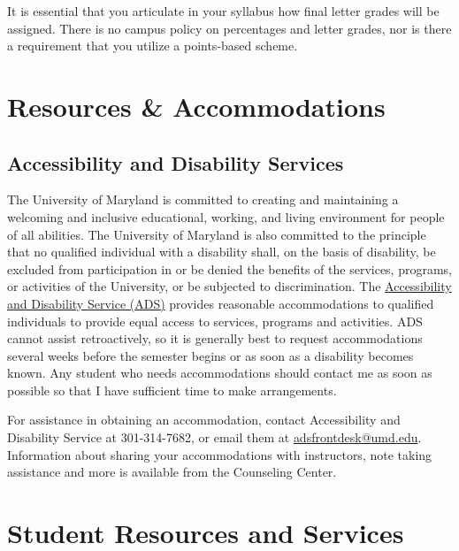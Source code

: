 \documentclass[11pt]{article}
\begin{document}
It is essential that you articulate in your syllabus how final letter
grades will be assigned. There is no campus policy on percentages and
letter grades, nor is there a requirement that you utilize a
points-based scheme.

\hypertarget{resources-accommodations}{%
\section{Resources \& Accommodations}\label{resources-accommodations}}

\hypertarget{accessibility-and-disability-services}{%
\subsection{Accessibility and Disability
Services}\label{accessibility-and-disability-services}}

The University of Maryland is committed to creating and maintaining a
welcoming and inclusive educational, working, and living environment for
people of all abilities. The University of Maryland is also committed to
the principle that no qualified individual with a disability shall, on
the basis of disability, be excluded from participation in or be denied
the benefits of the services, programs, or activities of the University,
or be subjected to discrimination. The
\href{https://www.counseling.umd.edu/ads/}{Accessibility and Disability
Service (ADS)} provides reasonable accommodations to qualified
individuals to provide equal access to services, programs and
activities. ADS cannot assist retroactively, so it is generally best to
request accommodations several weeks before the semester begins or as
soon as a disability becomes known. Any student who needs accommodations
should contact me as soon as possible so that I have sufficient time to
make arrangements.

For assistance in obtaining an accommodation, contact Accessibility and
Disability Service at 301-314-7682, or email them at
\url{adsfrontdesk@umd.edu}. Information about sharing your
accommodations with instructors, note taking assistance and more is
available from the Counseling Center.

\hypertarget{student-resources-and-services}{%
\section{Student Resources and
Services}\label{student-resources-and-services}}
\end{document}
